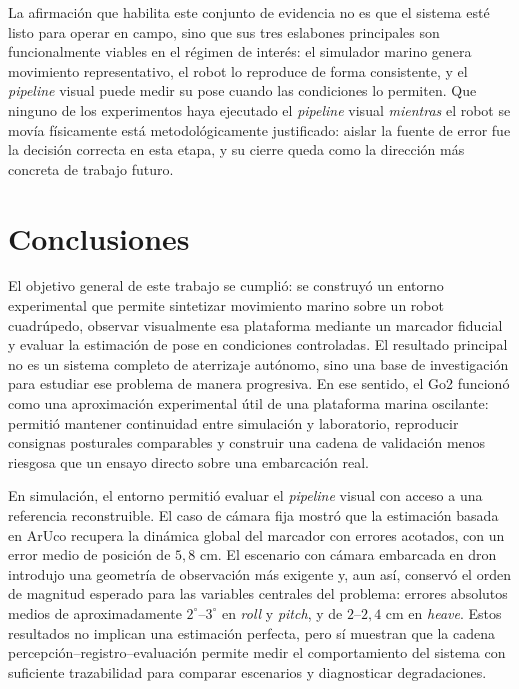 \documentclass[12pt,a4paper]{report}
\begin{document}
La afirmación que habilita este conjunto de evidencia no es que el sistema
esté listo para operar en campo, sino que sus tres eslabones principales son
funcionalmente viables en el régimen de interés: el simulador marino genera
movimiento representativo, el robot lo reproduce de forma consistente, y el
\textit{pipeline} visual puede medir su pose cuando las condiciones lo permiten. Que
ninguno de los experimentos haya ejecutado el \textit{pipeline} visual \emph{mientras}
el robot se movía físicamente está metodológicamente justificado: aislar la
fuente de error fue la decisión correcta en esta etapa, y su cierre queda
como la dirección más concreta de trabajo futuro.



\chapter{Conclusiones}

El objetivo general de este trabajo se cumplió: se construyó un entorno
experimental que permite sintetizar movimiento marino sobre un robot
cuadrúpedo, observar visualmente esa plataforma mediante un marcador fiducial y
evaluar la estimación de pose en condiciones controladas. El resultado principal
no es un sistema completo de aterrizaje autónomo, sino una base de investigación
para estudiar ese problema de manera progresiva. En ese sentido, el Go2 funcionó
como una aproximación experimental útil de una plataforma marina oscilante:
permitió mantener continuidad entre simulación y laboratorio, reproducir
consignas posturales comparables y construir una cadena de validación menos
riesgosa que un ensayo directo sobre una embarcación real.

En simulación, el entorno permitió evaluar el \textit{pipeline} visual con acceso a una
referencia reconstruible. El caso de cámara fija mostró que la estimación basada
en ArUco recupera la dinámica global del marcador con errores acotados, con un
error medio de posición de \(5{,}8\) cm. El escenario con cámara embarcada en
dron introdujo una geometría de observación más exigente y, aun así, conservó
el orden de magnitud esperado para las variables centrales del problema:
errores absolutos medios de aproximadamente \(2^\circ\)--\(3^\circ\) en \emph{roll} y
\emph{pitch}, y de \(2\)--\(2{,}4\) cm en \emph{heave}. Estos resultados no implican una
estimación perfecta, pero sí muestran que la cadena
percepción--registro--evaluación permite medir el comportamiento del sistema con suficiente
trazabilidad para comparar escenarios y diagnosticar degradaciones.
\end{document}
